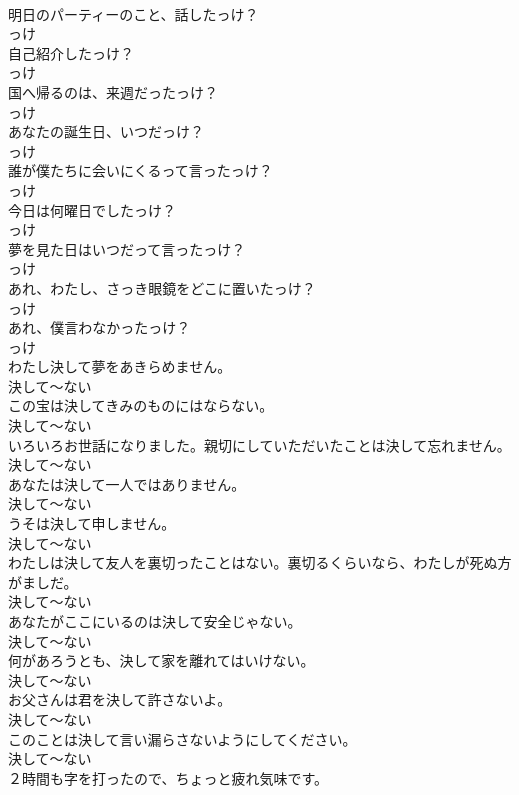 \documentclass[8pt]{extreport}
\begin{document}
\begin{CJK}{UTF8}{min}
\\	明日のパーティーのこと、話したっけ？	
\\	っけ
\\	自己紹介したっけ？	
\\	っけ
\\	国へ帰るのは、来週だったっけ？	
\\	っけ
\\	あなたの誕生日、いつだっけ？	
\\	っけ
\\	誰が僕たちに会いにくるって言ったっけ？	
\\	っけ
\\	今日は何曜日でしたっけ？	
\\	っけ
\\	夢を見た日はいつだって言ったっけ？	
\\	っけ
\\	あれ、わたし、さっき眼鏡をどこに置いたっけ？	
\\	っけ
\\	あれ、僕言わなかったっけ？	
\\	っけ
\\	わたし決して夢をあきらめません。	
\\	決して～ない
\\	この宝は決してきみのものにはならない。	
\\	決して～ない
\\	いろいろお世話になりました。親切にしていただいたことは決して忘れません。	
\\	決して～ない
\\	あなたは決して一人ではありません。	
\\	決して～ない
\\	うそは決して申しません。	
\\	決して～ない
\\	わたしは決して友人を裏切ったことはない。裏切るくらいなら、わたしが死ぬ方がましだ。	
\\	決して～ない
\\	あなたがここにいるのは決して安全じゃない。	
\\	決して～ない
\\	何があろうとも、決して家を離れてはいけない。	
\\	決して～ない
\\	お父さんは君を決して許さないよ。	
\\	決して～ない
\\	このことは決して言い漏らさないようにしてください。	
\\	決して～ない
\\	２時間も字を打ったので、ちょっと疲れ気味です。	

\end{CJK}
\end{document}
